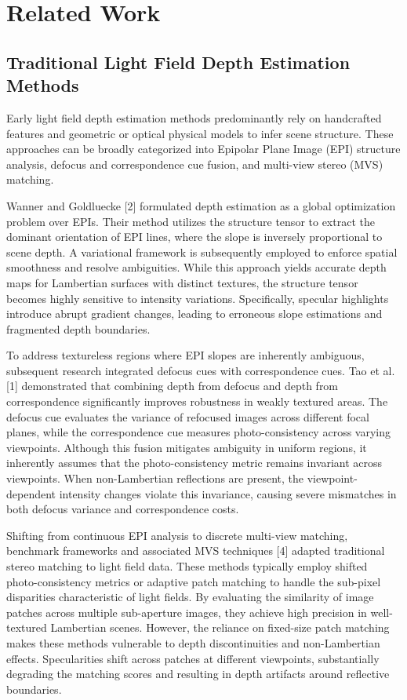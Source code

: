 \section{Related Work}

\subsection{Traditional Light Field Depth Estimation Methods}

Early light field depth estimation methods predominantly rely on handcrafted features and geometric or optical physical models to infer scene structure. These approaches can be broadly categorized into Epipolar Plane Image (EPI) structure analysis, defocus and correspondence cue fusion, and multi-view stereo (MVS) matching.

Wanner and Goldluecke [2] formulated depth estimation as a global optimization problem over EPIs. Their method utilizes the structure tensor to extract the dominant orientation of EPI lines, where the slope is inversely proportional to scene depth. A variational framework is subsequently employed to enforce spatial smoothness and resolve ambiguities. While this approach yields accurate depth maps for Lambertian surfaces with distinct textures, the structure tensor becomes highly sensitive to intensity variations. Specifically, specular highlights introduce abrupt gradient changes, leading to erroneous slope estimations and fragmented depth boundaries.

To address textureless regions where EPI slopes are inherently ambiguous, subsequent research integrated defocus cues with correspondence cues. Tao et al. [1] demonstrated that combining depth from defocus and depth from correspondence significantly improves robustness in weakly textured areas. The defocus cue evaluates the variance of refocused images across different focal planes, while the correspondence cue measures photo-consistency across varying viewpoints. Although this fusion mitigates ambiguity in uniform regions, it inherently assumes that the photo-consistency metric remains invariant across viewpoints. When non-Lambertian reflections are present, the viewpoint-dependent intensity changes violate this invariance, causing severe mismatches in both defocus variance and correspondence costs.

Shifting from continuous EPI analysis to discrete multi-view matching, benchmark frameworks and associated MVS techniques [4] adapted traditional stereo matching to light field data. These methods typically employ shifted photo-consistency metrics or adaptive patch matching to handle the sub-pixel disparities characteristic of light fields. By evaluating the similarity of image patches across multiple sub-aperture images, they achieve high precision in well-textured Lambertian scenes. However, the reliance on fixed-size patch matching makes these methods vulnerable to depth discontinuities and non-Lambertian effects. Specularities shift across patches at different viewpoints, substantially degrading the matching scores and resulting in depth artifacts around reflective boundaries.

